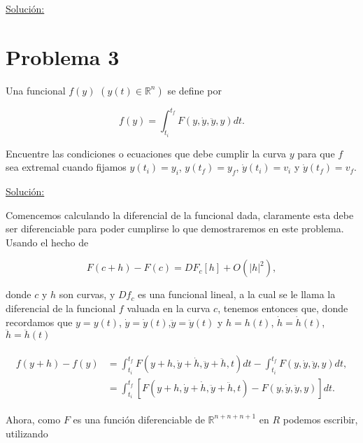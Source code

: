 \documentclass[a4paper,10pt]{article}
\numberwithin{equation}{section}
\begin{document}
\vspace{.3cm}

\underline{Solución:} \vspace{.3cm}

\section{Problema 3}

Una funcional $f(y)$ $(y(t) \in \mathbb{R}^n)$ se define por 

$$
f(y) = \int_{t_{i}}^{t_{f}} F(y,\dot{y},\ddot{y},y)dt.
$$

Encuentre las condiciones o ecuaciones que debe cumplir la curva $y$ para que $f$ sea
extremal cuando fijamos $y(t_i) = y_i$, $y(t_f)=y_f$, $\dot{y}(t_i) = v_i$ y
$\dot{y}(t_f) = v_f$.

\vspace{.3cm}

\underline{Solución:} \vspace{.3cm}

Comencemos calculando la diferencial de la funcional dada, claramente esta debe ser 
diferenciable para poder cumplirse lo que demostraremos en este problema. Usando 
el hecho de 

\begin{equation}
 F(c+h) - F(c) = DF_c[h]+O(|h|^2),
 \label{eq:diferencialFuncional1}
\end{equation}

donde $c$ y $h$ son curvas, y $Df_c$ es una funcional lineal, a la cual se le llama 
la diferencial de la funcional $f$ valuada en la curva $c$, tenemos entonces que, 
donde recordamos que $y = y(t)$, $\dot{y} = \dot{y}(t)$,$\ddot{y} = \ddot{y}(t)$ y $h=h(t)$, 
$\dot{h}=\dot{h}(t)$, $\ddot{h}=\ddot{h}(t)$

\begin{align}
\begin{split}
 f(y+h) - f(y) &= \int_{t_{i}}^{t_{f}} F(y+h,\dot{y}+ \dot{h}, \ddot{y} + \ddot{h}, t)dt -
 \int_{t_{i}}^{t_{f}} F(y,\dot{y},\ddot{y},y)dt, \\
	       &= \int_{t_{i}}^{t_{f}} \left[ F(y+h,\dot{y}+ \dot{h}, \ddot{y} + \ddot{h}, t)
	       -F(y,\dot{y},\ddot{y},y) \right]dt.
 \end{split}
\end{align}

Ahora, como $F$ es una función diferenciable de $\mathbb{R}^{n+n+n+1}$ en $R$ podemos 
escribir, utilizando 
\end{document}
